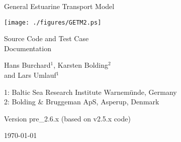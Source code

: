 \documentclass[a4paper,twoside]{article}
\begin{document}
\begin{titlepage}

\vfill

{\sf \bf \huge
 \begin{center}
   General Estuarine Transport Model
 \end{center}
}
\begin{center}
\texttt{[image: ./figures/GETM2.ps]}
\end{center}

\vspace{6mm}

{\sf \bf \LARGE
 \begin{center}
   Source Code and Test Case \\ Documentation
 \end{center}
}

{\sf \bf \LARGE
 \begin{center}
Hans Burchard$^{1}$, Karsten Bolding$^2$\\ and Lars Umlauf$^1$   
 \end{center}
}


\vspace{6mm}

{\sf \bf \Large
 \begin{center}
 1: Baltic Sea Research Institute Warnem\"unde, Germany \\
 2: Bolding \& Bruggeman ApS, Asperup, Denmark \\
 \end{center}
}


\vspace{5mm}

{\sf \bf \Large
 \begin{center}
  Version pre\_2.6.x (based on v2.5.x code)
 \end{center}
}

\vfill


{\sf \bf \Large
 \begin{center}
\today
 \end{center}
}

\vfill

\end{titlepage}


\cleardoublepage
\tableofcontents


\cleardoublepage
%

\end{document}
